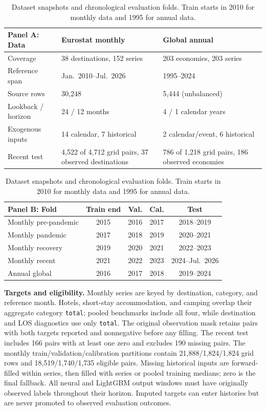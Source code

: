 \documentclass[sigconf]{acmart}
\begin{document}
\begin{table}[!t]
\centering
\caption{Dataset snapshots and chronological evaluation folds. Train starts in 2010 for monthly data and 1995 for annual data.}
\label{tab:datasets}
\label{tab:protocol_folds}
\scriptsize
\setlength{\tabcolsep}{2.5pt}
\renewcommand{\arraystretch}{1.06}
\begin{tabular}{@{}p{}p{}p{}@{}}
\toprule
\textbf{Panel A: Data} & \textbf{Eurostat monthly} & \textbf{Global annual} \\
\midrule
Coverage & 38 destinations, 152 series & 203 economies, 203 series \\
Reference span & Jan.\ 2010--Jul.\ 2026 & 1995--2024 \\
Source rows & 30,248 & 5,444 (unbalanced) \\
Lookback / horizon & 24 / 12 months & 4 / 1 calendar years \\
Exogenous inputs & 14 calendar, 7 historical & 2 calendar/event, 6 historical \\
Recent test & 4,522 of 4,712 grid pairs, 37 observed destinations & 786 of 1,218 grid pairs, 186 observed economies \\
\bottomrule
\end{tabular}
\par\vspace{4pt}
\begin{tabular}{@{}lcccc@{}}
\toprule
\textbf{Panel B: Fold} & \textbf{Train end} & \textbf{Val.} & \textbf{Cal.} & \textbf{Test} \\
\midrule
Monthly pre-pandemic & 2015 & 2016 & 2017 & 2018--2019 \\
Monthly pandemic & 2017 & 2018 & 2019 & 2020--2021 \\
Monthly recovery & 2019 & 2020 & 2021 & 2022--2023 \\
Monthly recent & 2021 & 2022 & 2023 & 2024--Jul.\ 2026 \\
Annual global & 2016 & 2017 & 2018 & 2019--2024 \\
\bottomrule
\end{tabular}
\end{table}

\textbf{Targets and eligibility.} Monthly series are keyed by destination, category, and reference month. Hotels, short-stay accommodation, and camping overlap their aggregate category \texttt{total}; pooled benchmarks include all four, while destination and LOS diagnostics use only \texttt{total}. The original observation mask retains pairs with both targets reported and nonnegative before any filling. The recent test includes 166 pairs with at least one zero and excludes 190 missing pairs. The monthly train/validation/calibration partitions contain 21,888/1,824/1,824 grid rows and 18,519/1,740/1,735 eligible pairs. Missing historical inputs are forward-filled within series, then filled with series or pooled training medians; zero is the final fallback. All neural and LightGBM output windows must have originally observed labels throughout their horizon. Imputed targets can enter histories but are never promoted to observed evaluation outcomes.
\end{document}
